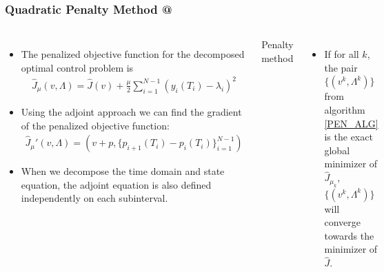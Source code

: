 \documentclass[9pt]{beamer}
\makeatletter
\newcommand*{\rom}[1]{\expandafter\@slowromancap\romannumeral #1@}
\makeatother
\begin{document}
\begin{frame}
\frametitle{Quadratic Penalty Method \rom{2}}
\begin{columns}
\begin{itemize}
\item{The penalized objective function for the decomposed optimal control problem is {\tiny
\begin{align*}
\hat{J}_{\mu}(v,\Lambda) = \hat{J}(v) + \frac{\mu}{2}\sum_{i=1}^{N-1}(y_{i}(T_i)-\lambda_i)^2
\end{align*}}}
\item{Using the adjoint approach we can find the gradient of the penalized objective function: {\tiny
\begin{align*}
\hat J_{\mu}'(v,\Lambda) = (v+p,\{p_{i+1}(T_i)-p_{i}(T_i)\}_{i=1}^{N-1})
\end{align*}}}
\item{When we decompose the time domain and state equation, the adjoint equation is also defined independently on each subinterval.}
\end{itemize}
{\tiny
\begin{algorithm}[H] 
\caption{Penalty method\label{PEN_ALG}}
\end{algorithm}}%
\begin{itemize}
\item{If for all $k$, the pair $\{(v^k,\Lambda^k)\}$ from algorithm \ref{PEN_ALG} is the exact global minimizer of $\hat J_{\mu_k}$, $\{(v^k,\Lambda^k)\}$ will converge towards the minimizer of $\hat J$.}
\end{itemize}
\end{columns}
\end{frame}
\end{document}
